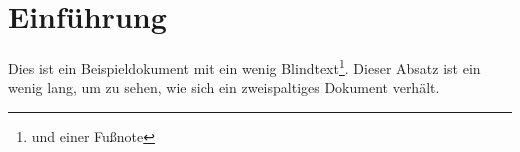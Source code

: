 \documentclass[a4paper, twocolumn]{scrreprt} %
\begin{document}
\section{Einführung}

Dies ist ein Beispieldokument mit ein wenig
Blindtext\footnote{und einer Fußnote}. Dieser Absatz ist ein
wenig lang, um zu sehen, wie sich ein zweispaltiges Dokument
verhält.
\end{document}
